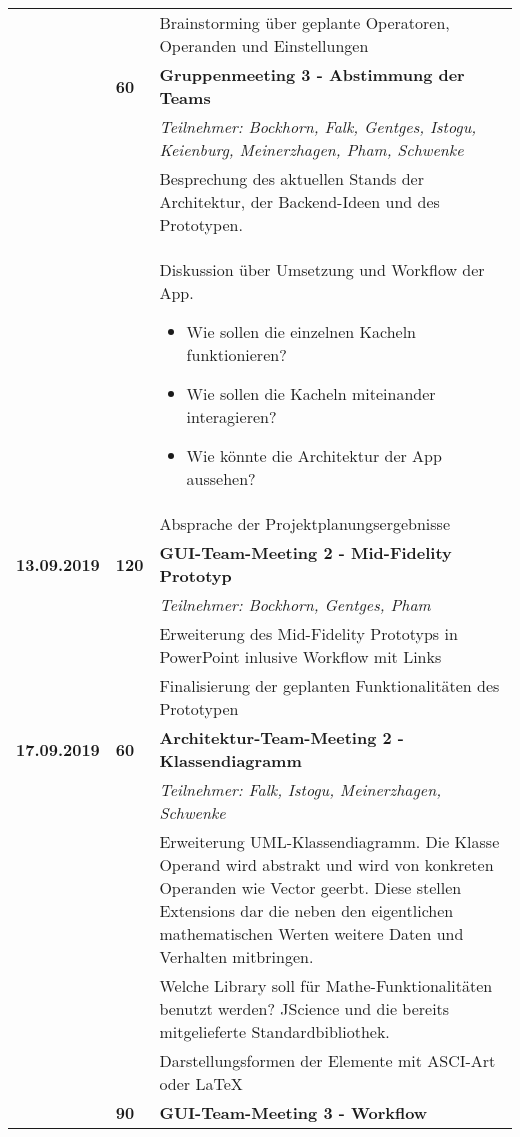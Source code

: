 {\begin{longtable}{|l|l|p{11cm}|}
			\\ & &
			Brainstorming über geplante Operatoren, Operanden und Einstellungen
		\\ \cline{2-3}
		& \textbf{\hfill60} & \textbf{Gruppenmeeting 3 - Abstimmung der Teams} 
			\\ & &
			\small{\textit{Teilnehmer: Bockhorn, Falk, Gentges, Istogu, Keienburg, Meinerzhagen, Pham, Schwenke}}
			\\ & &
			Besprechung des aktuellen Stands der Architektur, der Backend-Ideen und des Prototypen.
			\\ & &
			Diskussion über Umsetzung und Workflow der App.
			\begin{itemize}\renewcommand\labelitemi{--}
				\item  Wie sollen die einzelnen Kacheln funktionieren?
				\item Wie sollen die Kacheln miteinander interagieren?
				\item Wie könnte die Architektur der App aussehen?
			\end{itemize}
			\\ & &
			Absprache der Projektplanungsergebnisse
	\\\hline
		\textbf{13.09.2019} 
			& \hfill\textbf{120} & \textbf{GUI-Team-Meeting 2 - Mid-Fidelity Prototyp} 
			\\ & &
			\small{\textit{Teilnehmer: Bockhorn, Gentges, Pham}}
			\\ & &
			Erweiterung des Mid-Fidelity Prototyps in PowerPoint inlusive Workflow mit Links
			\\ & &
			Finalisierung der geplanten Funktionalitäten des Prototypen
	\\\hline
		\textbf{17.09.2019} 
			& \hfill \textbf{ 60} & \textbf{Architektur-Team-Meeting 2 - Klassendiagramm}
			\\ & &
			\small{\textit{Teilnehmer: Falk, Istogu, Meinerzhagen, Schwenke}}
			\\ & &
			Erweiterung UML-Klassendiagramm. Die Klasse Operand wird abstrakt und wird von konkreten Operanden wie Vector geerbt. Diese stellen Extensions dar die neben den eigentlichen mathematischen Werten weitere Daten und Verhalten mitbringen.
			\\ & &
			Welche Library soll für Mathe-Funktionalitäten benutzt werden? JScience und die bereits mitgelieferte Standardbibliothek.
			\\ & &
			Darstellungsformen der Elemente mit ASCI-Art oder LaTeX
		\\ \cline{2-3}
		& \textbf{\hfill90} & \textbf{GUI-Team-Meeting 3 - Workflow} 

\end{longtable}}
